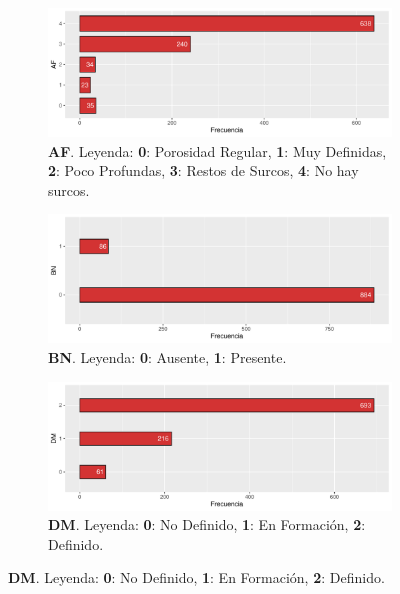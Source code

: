 \begin{figure}[p]
    \centering
    \begin{subfigure}{\textwidth}
        \includegraphics[width=\linewidth]{../../scripts/eda/eda_univar/char_af_distr.pdf}
        \caption{\textbf{AF}. Leyenda: \textbf{0}: Porosidad Regular, \textbf{1}: Muy Definidas, \textbf{2}: Poco Profundas, \textbf{3}: Restos de Surcos, \textbf{4}: No hay surcos.}
        \label{fig4:todd_chars__af}
    \end{subfigure}

    \begin{subfigure}{\textwidth}
        \includegraphics[width=\linewidth]{../../scripts/eda/eda_univar/char_bn_distr.pdf}
        \caption{\textbf{BN}. Leyenda: \textbf{0}: Ausente, \textbf{1}: Presente.}
        \label{fig4:todd_chars__bn}
    \end{subfigure}
    
    \begin{subfigure}{\textwidth}
        \includegraphics[width=\linewidth]{../../scripts/eda/eda_univar/char_dm_distr.pdf}
        \caption{\textbf{DM}. Leyenda: \textbf{0}: No Definido, \textbf{1}: En Formación, \textbf{2}: Definido.}
        \label{fig4:todd_chars__dm}
    \end{subfigure}

\end{figure}
